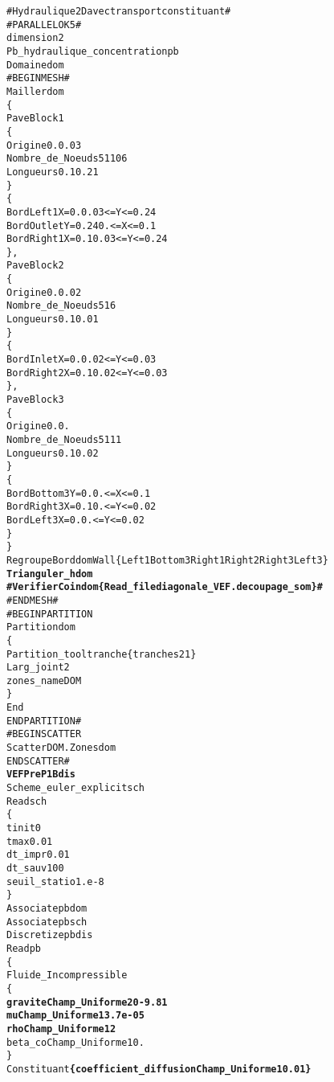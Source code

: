 \begin{alltt}
# Hydraulique 2D avec transport constituant #
# PARALLEL OK 5 #
dimension 2
Pb_hydraulique_concentration pb
Domaine dom
# BEGIN MESH #
Mailler dom
\{
    Pave Block1 
    \{
        Origine 0. 0.03
        Nombre_de_Noeuds 51 106 
        Longueurs 0.1 0.21
    \}
    \{
        Bord Left1    X = 0.    0.03 <= Y <= 0.24
        Bord Outlet     Y = 0.24  0.   <= X <= 0.1
        Bord Right1   X = 0.1   0.03 <= Y <= 0.24
    \} ,
    Pave Block2
    \{
        Origine 0. 0.02
        Nombre_de_Noeuds 51 6
        Longueurs 0.1 0.01
    \}
    \{
        Bord Inlet    X = 0.    0.02 <= Y <= 0.03
        Bord Right2   X = 0.1   0.02 <= Y <= 0.03
    \} ,
    Pave Block3
    \{
        Origine 0. 0.
        Nombre_de_Noeuds 51 11
        Longueurs 0.1 0.02
    \}
    \{
        Bord Bottom3   Y = 0.    0. <= X <= 0.1
        Bord Right3    X = 0.1   0. <= Y <= 0.02
        Bord Left3     X = 0.    0. <= Y <= 0.02
    \}
\}
RegroupeBord dom Wall \{ Left1 Bottom3 Right1 Right2 Right3 Left3 \}
{\bf{Trianguler_h dom }}
{\bf{# VerifierCoin dom \{ Read_file diagonale_VEF.decoupage_som \} # }}
# END MESH #
# BEGIN PARTITION
Partition dom
\{
    Partition_tool tranche \{ tranches 2 1 \}
    Larg_joint 2
    zones_name DOM
\}
End
END PARTITION #
# BEGIN SCATTER
Scatter DOM.Zones dom
END SCATTER #
{\bf{VEFPreP1B dis}}
Scheme_euler_explicit sch
Read sch
\{
    tinit 0
    tmax 0.01
    dt_impr 0.01
    dt_sauv 100
    seuil_statio 1.e-8
\}
Associate pb dom
Associate pb sch
Discretize pb dis
Read pb
\{
    Fluide_Incompressible
    \{
        {\bf{gravite Champ_Uniforme 2 0 -9.81}}
        {\bf{mu Champ_Uniforme 1 3.7e-05}}
        {\bf{rho Champ_Uniforme 1 2}}
        beta_co Champ_Uniforme 1 0.
    \}
    Constituant {\bf{\{ coefficient_diffusion Champ_Uniforme 1 0.01 \} }}


\end{alltt}
